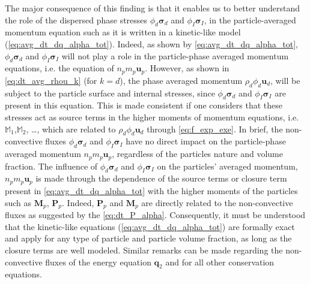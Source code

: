 The major consequence of this finding is that it enables us to better understand the role of the dispersed phase stresses $\phi_d\bm{\sigma}_d$ and $\phi_I\bm{\sigma}_I$, in the particle-averaged momentum equation such as it is written in a kinetic-like model (\ref{eq:avg_dt_dq_alpha_tot}). 
Indeed, as shown by \ref{eq:avg_dt_dq_alpha_tot}, $\phi_d\bm{\sigma}_d$ and $\phi_I\bm{\sigma}_I$ will not play a role in the particle-phase averaged momentum equations, i.e. the equation of $n_p m_p \textbf{u}_p$. 
However, as shown in \ref{eq:dt_avg_rhou_k} (for $k =d$), the phase averaged momentum $\rho_d \phi_d \textbf{u}_d$,  will be subject to the particle surface and internal stresses, since $\phi_d\bm{\sigma}_d$ and $\phi_I\bm{\sigma}_I$ are present in this equation.
This is made consistent if one considers that these stresses act as source terms in the higher moments of momentum equations, i.e.  $\mathbb{M}_1$,$\mathbb{M}_2$, \ldots, which are related to $\rho_d \phi_d \textbf{u}_d$ through \ref{eq:f_exp_exe}. 
In brief, the non-convective fluxes $\phi_d\bm{\sigma}_d$ and $\phi_I\bm{\sigma}_I$  have no direct impact on the particle-phase averaged momentum $n_p m_p\textbf{u}_p$, regardless of the particles nature and volume fraction. 
The influence of $\phi_d\bm{\sigma}_d$ and $\phi_I\bm{\sigma}_I$ on the particles' averaged momentum, $n_p m_p \textbf{u}_p$ is made through the dependence of the source terms or closure term present in \ref{eq:avg_dt_dq_alpha_tot} with the higher moments of the particles such as $\textbf{M}_p$, $\textbf{P}_p$. 
Indeed, $\textbf{P}_p$ and $\textbf{M}_p$ are directly related to the non-convective fluxes as suggested by the \ref{eq:dt_P_alpha}. 
Consequently, it must be understood that the kinetic-like equations (\ref{eq:avg_dt_dq_alpha_tot}) are formally exact and apply for any type of particle and particle volume fraction, as long as the closure terms are well modeled. 
Similar remarks can be made regarding the non-convective fluxes of the energy equation $\textbf{q}_2$ and for all other conservation equations. 


